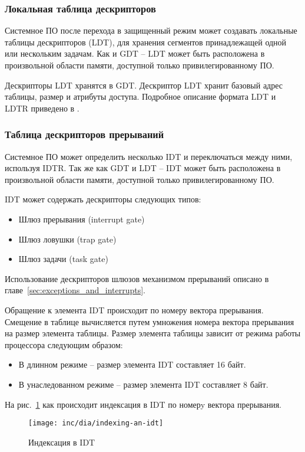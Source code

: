\subsubsection*{Локальная таблица дескрипторов}
Системное ПО после перехода в защищенный режим может создавать локальные таблицы дескрипторов (LDT),
для хранения сегментов принадлежащей одной или нескольким задачам. Как и GDT -- LDT может быть расположена
в произвольной области памяти, доступной только привилегированному ПО.

Дескрипторы LDT хранятся в GDT. Дескриптор LDT хранит базовый адрес таблицы, размер и атрибуты доступа.
Подробное описание формата LDT и LDTR приведено в \cite{amd_pm_v2}.

\subsubsection*{Таблица дескрипторов прерываний}
Системное ПО может определить несколько IDT и переключаться между ними, используя IDTR. Так же как
GDT и LDT -- IDT может быть расположена в произвольной области памяти, доступной только привилегированному ПО.

IDT может содержать дескрипторы следующих типов:
\begin{itemize}
	\item Шлюз прерывания (interrupt gate)
	\item Шлюз ловушки (trap gate)
	\item Шлюз задачи (task gate)
\end{itemize}

Использование дескрипторов шлюзов механизмом прерываний описано в главе~\ref{sec:exceptions_and_interrupts}.

Обращение к элемента IDT происходит по номеру вектора прерывания. Смещение в таблице вычисляется путем
умножения номера вектора прерывания на размер элемента таблицы. Размер элемента таблицы зависит от
режима работы процессора следующим образом:
\begin{itemize}
\item В длинном режиме -- размер элемента IDT составляет 16 байт.
\item В унаследованном режиме -- размер элемента IDT составляет 8 байт.
\end{itemize}

На рис.~\ref{fig:indexing-an-idt} как происходит индексация в IDT по номерy вектора прерывания.

\begin{figure}
  \centering
  \texttt{[image: inc/dia/indexing-an-idt]}
  \caption{Индексация в IDT}
  \label{fig:indexing-an-idt}
\end{figure}


